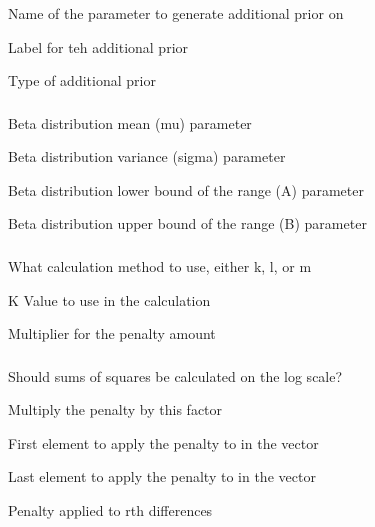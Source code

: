 
 {Name of the parameter to generate additional prior on}

 {Label for teh additional prior}

 {Type of additional prior}

\subsubsection[Beta]{}

 {Beta distribution mean (mu) parameter}

 {Beta distribution variance (sigma) parameter}

 {Beta distribution lower bound of the range (A) parameter}

 {Beta distribution upper bound of the range (B) parameter}

\subsubsection[Vector Average]{}

 {What calculation method to use, either k, l, or m}

 {K Value to use in the calculation}

 {Multiplier for the penalty amount}

\subsubsection[Vector Smoothing]{}

 {Should sums of squares be calculated on the log scale?}

 {Multiply the penalty by this factor}

 {First element to apply the penalty to in the vector}

 {Last element to apply the penalty to in the vector}

 {Penalty applied to rth differences}

